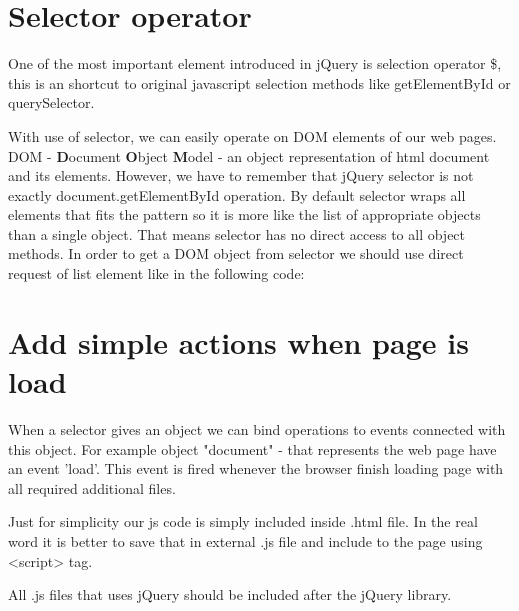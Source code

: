 \section{Selector operator}
One of the most important element introduced in jQuery is selection operator \$, this is an shortcut to original javascript selection methods like getElementById or querySelector.


With use of selector, we can easily operate on DOM elements of our web pages. DOM - \textbf{D}ocument \textbf{O}bject \textbf{M}odel - an object representation of html document and its elements. However, we have to remember that jQuery selector is not exactly document.getElementById operation. By default selector wraps all elements that fits the pattern so it is more like the list of appropriate objects than a single object. That means selector has no direct access to all object methods. In order to get a DOM object from selector we should use direct request of list element like in the following code:



\section{Add simple actions when page is load}
When a selector gives an object we can bind operations to events connected with this object. For example object "document" - that represents the web page have an event 'load'. This event is fired whenever  the browser finish loading page with all required additional files.


\begin{remark}
Just for simplicity our js code is simply included inside .html file. In the real word it is better to save that in external .js file and include to the page using <script> tag. \begin{warning} All .js files that uses jQuery should be included after the jQuery library.\end{warning}
\end{remark}

